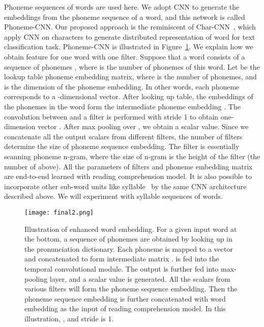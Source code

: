 \documentclass[a4paper]{article}
\begin{document}
Phoneme sequences of words are used here.
We adopt CNN to generate the  embeddings from the phoneme sequence of a word, and this network is called Phoneme-CNN. 
Our proposed approach is the reminiscent of Char-CNN~\cite{zhang2015character,kim2016character}, which apply CNN on characters to generate distributed representation of word for text classification task. 
Phoneme-CNN is illustrated in Figure~\ref{fig:phonemeCNN}.
We explain how we obtain feature for one word with one filter. 
Suppose that a word  consists of a sequence of phonemes , where  is the number of phonemes of this word. 
Let  be the lookup table phoneme embedding matrix, where  is the number of  phonemes, and  is the dimension  of the phoneme embedding. 
In other words, each phoneme corresponds to a -dimensional vector.
After looking up table, the embeddings of the phonemes in the word form the intermediate phoneme embedding . The convolution between  and a filter  is performed with stride 1 to obtain one-dimension vector . After max pooling over , we obtain a scalar value. 
Since we concatenate all the output scalars from different filters, the number of filters determine the size of phoneme sequence embedding. 
The filter is essentially scanning phoneme n-gram, where the size of n-gram is the height of the filter (the number of  above). All the parameters of filters  and phoneme embedding matrix  are end-to-end learned with reading comprehension model. 
It  is also possible to incorporate other sub-word units like syllable~\cite{luong2013better,botha2014compositional,bian2014knowledge} by the same CNN architecture described above. We will experiment with syllable sequences of words.





\begin{figure}[t]
  \centering
  \texttt{[image: final2.png]}
  \caption{Illustration of enhanced word embedding. 
  For a given input word  at the bottom, a sequence of phonemes  are obtained by looking up in the pronunciation dictionary. 
  Each phoneme is mapped to a vector  and concatenated to form intermediate matrix .
   is fed into the temporal convolutional module. 
  The output  is further fed into max-pooling layer, and a scalar value is generated. All the scalars from various filters will form the phoneme sequence embedding. 
  Then the phoneme sequence embedding is further concatenated with word embedding as the input  of reading comprehension model.  In this illustration,  ,  and stride is 1.}
  \label{fig:phonemeCNN}
\end{figure}
\end{document}
